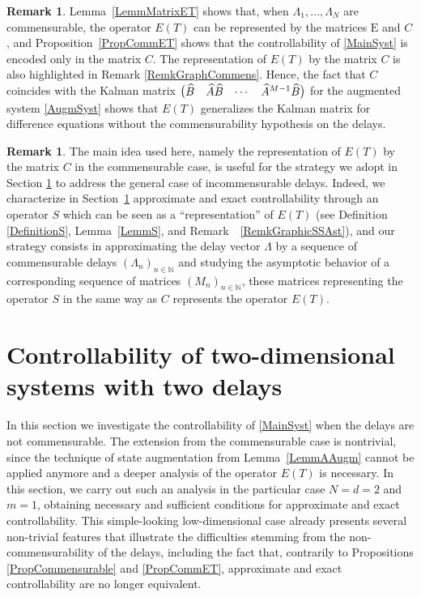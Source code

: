 \documentclass[JEP,XML,SOM,Unicode]{cedram}
\renewenvironment{bmatrix}{\bigl(\begin{matrix}}{\end{matrix}\bigr)}
\theoremstyle{plain}
\theoremstyle{definition}
\newtheorem{remk}[theo]{Remark}
\newcommand{\Epsilon}{\mathrm E}
\begin{document}
\begin{remk}
Lemma~\ref{LemmMatrixET} shows that, when $\Lambda_1, \dots, \Lambda_N$ are commensurable, the operator $E(T)$ can be represented by the matrices $\Epsilon$ and $C$, and Proposition~\ref{PropCommET} shows that the controllability of \eqref{MainSyst} is encoded only in the matrix $C$. The representation of $E(T)$ by the matrix $C$ is also highlighted in Remark \ref{RemkGraphCommens}. Hence, the fact that $C$ coincides with the Kalman matrix $\begin{bmatrix}\widehat B & \widehat A \widehat B & \cdots & \widehat A^{M-1} \widehat B\end{bmatrix}$ for the augmented system \eqref{AugmSyst} shows that $E(T)$ generalizes the Kalman matrix for difference equations without the commensurability hypothesis on the delays.
\end{remk}

\begin{remk}
\label{RemkCn}
The main idea used here, namely the representation of $E(T)$ by the matrix $C$ in the commensurable case, is useful for the strategy we adopt in Section \ref{SecTwoTwo} to address the general case of incommensurable delays. Indeed, we characterize in Section~\ref{SecTwoTwo} approximate and exact controllability through an operator $S$ which can be seen as a ``representation'' of $E(T)$ (see Definition \ref{DefinitionS}, Lemma~\ref{LemmS}, and Remark~ \ref{RemkGraphicSSAst}), and our strategy consists in approximating the delay vector $\Lambda$ by a sequence of commensurable delays $(\Lambda_n)_{n \in \mathbb N}$ and studying the asymptotic behavior of a corresponding sequence of matrices $(M_n)_{n \in \mathbb N}$, these matrices representing the operator $S$ in the same way as $C$ represents the operator $E(T)$.
\end{remk}

\section{Controllability of two-dimensional systems with two delays}
\label{SecTwoTwo}

In this section we investigate the controllability of \eqref{MainSyst} when the delays are not commensurable. The extension from the commensurable case is nontrivial, since the technique of state augmentation from Lemma~\ref{LemmAAugm} cannot be applied anymore and a deeper analysis of the operator $E(T)$ is necessary. In this section, we carry out such an analysis in the particular case $N = d = 2$ and $m = 1$, obtaining necessary and sufficient conditions for approximate and exact controllability. This simple-looking low-dimensional case already presents several non-trivial features that illustrate the difficulties stemming from the non-commensurability of the delays, including the fact that, contrarily to Propositions \ref{PropCommensurable} and \ref{PropCommET}, approximate and exact controllability are no longer equivalent.
\end{document}
